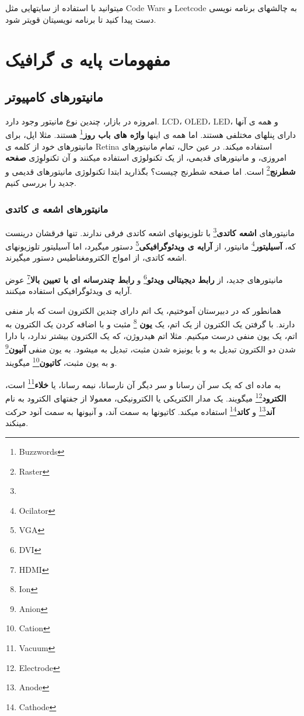 \documentclass[14pt,a4paper]{memoir}
\begin{document}
	میتوانید با استفاده از سایتهایی مثل Code Wars و Leetcode به چالشهای برنامه نویسی دست پیدا کنید تا برنامه نویسیتان قویتر شود.
	 
	 
	 
	 \chapter{مفهومات پایه ی گرافیک}\label{graphicsbasis}
	 
	 
	 \section{مانیتورهای کامپیوتر}\label{displays}

امروزه در بازار، چندین نوع مانیتور وجود دارد. LCD، OLED، LED، و همه ی آنها دارای پنلهای مختلفی هستند. اما همه ی اینها \textbf{واژه های باب روز}\footnote{Buzzwords} هستند. مثلا اپل، برای مانیتورهای خود از کلمه ی Retina استفاده میکند. در عین حال، تمام مانیتورهای امروزی، و مانیتورهای قدیمی، از یک تکنولوژی استفاده میکنند و آن تکنولوِژی \textbf{صفحه شطرنج}\footnote{Raster} است. اما صفحه شطرنج چیست؟ بگذارید ابتدا تکنولوژی مانیتورهای قدیمی و جدید را بررسی کنیم.

\subsection{مانیتورهای اشعه ی کاتدی}\label{crt}
مانیتورهای \textbf{اشعه کاتدی}\footnote{} با تلوزیونهای اشعه کاتدی فرقی ندارند. تنها فرقشان درینست که، \textbf{آسیلیتور}\footnote{Ocilator} مانیتور، از \textbf{آرایه ی ویدئوگرافیکی}\footnote{VGA} دستور میگیرد، اما آسیلیتور تلوزیونهای اشعه کاتدی، از امواج الکترومغناطیس دستور میگیرند. 


\begin{tip}
	مانیتورهای جدید، از \textbf{رابط دیجیتالی ویدئو}\footnote{DVI} و \textbf{رابط چندرسانه ای با تعیین بالا}\footnote{HDMI} عوض آرایه ی ویدئوگرافیکی استفاده میکنند.
\end{tip}


همانطور که در دبیرستان آموختیم، یک اتم دارای چندین الکترون است که بار منفی دارند. با گرفتن یک الکترون از یک اتم، یک \textbf{یون }\footnote{Ion} مثبت و با اضافه کردن یک الکترون به اتم، یک یون منفی درست میکنیم. مثلا  اتم هیدروژن، که یک الکترون بیشتر ندارد، با دارا شدن دو الکترون تبدیل به  و با یونیزه شدن مثبت، تبدیل به  میشود. به یون منفی \textbf{آنیون}\footnote{Anion} و به یون مثبت، \textbf{کاتیون}\footnote{Cation} میگویند.

به ماده ای که یک سر آن رسانا و سر دیگر آن نارسانا، نیمه رسانا، یا \textbf{خلاء}\footnote{Vacuum} است، \textbf{الکترود}\footnote{Electrode} میگویند. یک مدار الکتریکی یا الکترونیکی، معمولا از جفتهای الکترود به نام \textbf{آند}\footnote{Anode} و \textbf{کاتد}\footnote{Cathode} استفاده میکند. کاتیونها به سمت آند، و آنیونها به سمت آنود حرکت مینکند.
	 
\end{document}
